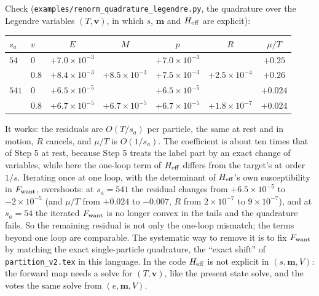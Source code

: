 \documentclass[11pt,aps,preprint,nofootinbib,superscriptaddress,tightenlines]{revtex4-2}
\begin{document}
Check (\nolinkurl{examples/renorm_quadrature_legendre.py}, the quadrature over the Legendre variables $(T,\bm v)$, in which $s$, $\bm m$ and $H_{\rm eff}$ are explicit):
\begin{center}
\small
\begin{tabular}{llccccc}
\toprule
$s_a$ & $v$ & $E$ & $M$ & $p$ & $R$ & $\mu/T$ \\
\midrule
$54$ & $0$ & $+7.0\times10^{-3}$ & & $+7.0\times10^{-3}$ & & $+0.25$ \\
 & $0.8$ & $+8.4\times10^{-3}$ & $+8.5\times10^{-3}$ & $+7.5\times10^{-3}$ & $+2.5\times10^{-4}$ & $+0.26$ \\
$541$ & $0$ & $+6.5\times10^{-5}$ & & $+6.5\times10^{-5}$ & & $+0.024$ \\
 & $0.8$ & $+6.7\times10^{-5}$ & $+6.7\times10^{-5}$ & $+6.7\times10^{-5}$ & $+1.8\times10^{-7}$ & $+0.024$ \\
\bottomrule
\end{tabular}
\end{center}
It works: the residuals are $O(T/s_a)$ per particle, the same at rest and in motion, $R$ cancels, and $\mu/T$ is $O(1/s_a)$.  The coefficient is about ten times that of
Step 5 at rest, because Step 5 treats the label part by an exact change of variables, while here the one-loop term of $H_{\rm eff}$ differs from the target's at order $1/s$.
Iterating once at one loop, with the determinant of $H_{\rm eff}$'s own susceptibility in $F_{\rm want}$, overshoots: at $s_a=541$ the residual changes from $+6.5\times10^{-5}$
to $-2\times10^{-5}$ (and $\mu/T$ from $+0.024$ to $-0.007$, $R$ from $2\times10^{-7}$ to $9\times10^{-7}$), and at $s_a=54$ the iterated $F_{\rm want}$ is no longer convex in the tails
and the quadrature fails.  So the remaining residual is not only the one-loop mismatch; the terms beyond one loop are comparable.  The systematic way to remove it is
to fix $F_{\rm want}$ by matching the exact single-particle quadrature, the ``exact shift'' of \nolinkurl{partition_v2.tex} in this language.  In the code $H_{\rm eff}$ is not explicit in $(s,\bm m,V)$:
the forward map needs a solve for $(T,\bm v)$, like the present state solve, and the votes the same solve from $(e,\bm m,V)$.
\end{document}
